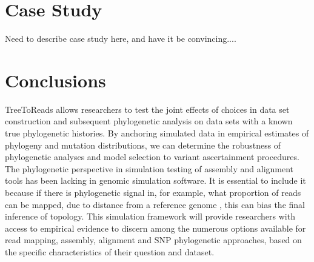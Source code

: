 \documentclass[a4paper,10pt]{article}
\begin{document}
\section{Case Study}
Need to describe case study here, and have it be convincing....


\section{Conclusions}
TreeToReads allows researchers to test the joint effects of choices in data set construction and subsequent phylogenetic analysis on data sets with a known true phylogenetic histories.
By anchoring simulated data in empirical estimates of phylogeny and mutation distributions, 
we can determine the robustness of phylogenetic analyses and model selection to variant ascertainment procedures.
The phylogenetic perspective in simulation testing of assembly and alignment tools has been lacking in genomic simulation software.
It is essential to include it because if there is phylogenetic signal in, for example, what proportion of reads can be mapped, due to distance from a reference genome \citep{bertels_automated_2014},
this can bias the final inference of topology.
This simulation framework will provide researchers with access to empirical evidence to discern among the numerous options available for read mapping, assembly, alignment and SNP phylogenetic approaches,
based on the specific characteristics of their question and dataset.


\end{document}
